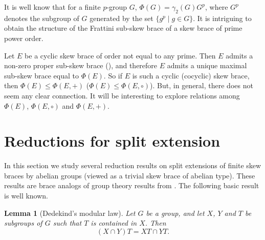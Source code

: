 \documentclass[11pt]{amsart}
\theoremstyle{thrm}
\theoremstyle{plain}
\newtheorem{lemma}[thm]{Lemma}
\theoremstyle{definition}
\numberwithin{equation}{section}
\begin{document}
It is well know that for a finite $p$-group $G$, $\Phi(G) = \gamma_2(G)G^p$, where $G^p$ denotes the subgroup of $G$ generated by the set $\{g^p \mid g \in G\}$. It is intriguing to obtain the structure of the Frattini sub-skew brace of a skew brace of prime power order.

  Let $E$ be a cyclic skew brace of order not equal to any prime. Then $E$ admits a non-zero proper sub-skew brace (\cite[Theorem A]{BEJP24}), and therefore $E$ admits a unique maximal sub-skew brace equal to $\Phi(E)$.  So if $E$ is such a cyclic (cocyclic) skew brace, then $\Phi(E) \le \Phi(E, +)$ ($\Phi(E) \le \Phi(E, \circ)$). But, in general, there does not seem any clear connection. It will be interesting to explore relations among  $\Phi(E)$, $\Phi(E, \circ)$ and $\Phi(E, +)$.
  
  


\section{Reductions for split extension}

	
In this section we study several reduction results on split extensions of finite skew braces by abelian groups (viewed as a trivial  skew brace of abelian type). These results are brace analogs of group theory results from \cite{Hill72}. The following basic result is well known.
\begin{lemma}[Dedekind's modular law]\label{Distribute}
Let $G$ be a group, and let $X$, $Y$ and $T$ be subgroups of $G$ such that $T$ is contained in $X$. Then
\[
(X \cap Y)T = XT \cap YT.
\]
\end{lemma}
\end{document}
